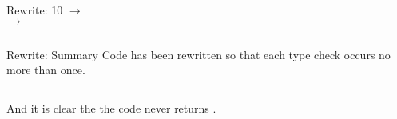 \begin{frame}{Rewrite: 10}
   $\to$ \\
   $\to$ 

  \begin{columns}
    \begin{column}{0.5\textwidth}
      \usebox\typecaseJbox
    \end{column}
    \begin{column}{0.5\textwidth}  %
      \usebox\typecaseKhbox
    \end{column}
  \end{columns}
\end{frame}


\begin{frame}{Rewrite: Summary}
  Code has been rewritten so that each type check occurs no more than once.

  \begin{columns}
    \begin{column}{0.5\textwidth}
      \usebox\typecaseAbox
    \end{column}
    \begin{column}{0.5\textwidth}  %
      \usebox\typecaseKbox
    \end{column}
  \end{columns}

  And it is clear the the code never returns .

\end{frame}


